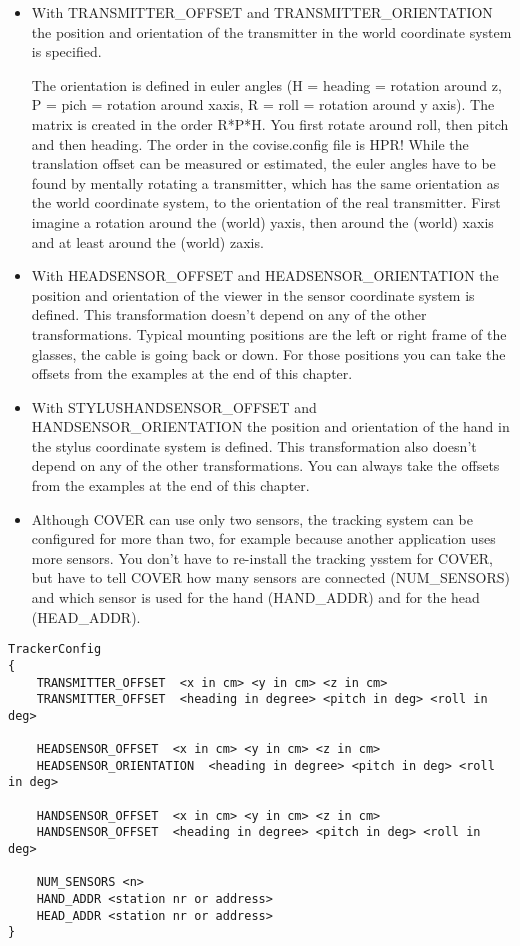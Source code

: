 \begin{itemize}

\item With TRANSMITTER\_OFFSET and 
TRANSMITTER\_ORIENTATION the position and orientation of
the transmitter in the world coordinate system is specified.

The orientation is defined in euler angles (H  = heading = rotation around z, 
P = pich = rotation around xaxis, R = roll = rotation around y axis).
The matrix is created in the order R*P*H. You first rotate around roll, then
pitch and then heading. The order in the covise.config file is HPR!
While the translation offset can be measured or estimated, the euler angles
have to be found by mentally rotating a transmitter, which has the
same orientation as the world coordinate system, to the orientation
of the real transmitter. First imagine a rotation around the (world) yaxis, 
then around the (world) xaxis and at least around the (world) zaxis.


\item With HEADSENSOR\_OFFSET and HEADSENSOR\_ORIENTATION the position and 
orientation of the viewer in the sensor coordinate system 
is defined. This transformation doesn't depend on any of the other 
transformations. Typical mounting positions are the left or right frame
of the glasses, the cable is going back or down. For those positions 
you can take the offsets from the examples at the end of this chapter.

\item With STYLUSHANDSENSOR\_OFFSET and HANDSENSOR\_ORIENTATION the position and
orientation of the hand in the stylus coordinate system is
defined. This transformation also doesn't depend on any of the other 
transformations. You can always take the offsets from the examples at the
end of this chapter.

\item Although COVER can use only two sensors, the tracking system can be
configured for more than two, for example because another application
uses more sensors. You don't have to re-install the tracking ysstem for COVER,
but have to tell COVER how many sensors are connected (NUM\_SENSORS) 
and which sensor is used for the hand (HAND\_ADDR) and for the head (HEAD\_ADDR).

\end{itemize}

\begin{verbatim}
TrackerConfig
{
    TRANSMITTER_OFFSET  <x in cm> <y in cm> <z in cm>
    TRANSMITTER_OFFSET  <heading in degree> <pitch in deg> <roll in deg> 
    
    HEADSENSOR_OFFSET  <x in cm> <y in cm> <z in cm>
    HEADSENSOR_ORIENTATION  <heading in degree> <pitch in deg> <roll in deg>
    
    HANDSENSOR_OFFSET  <x in cm> <y in cm> <z in cm>
    HANDSENSOR_OFFSET  <heading in degree> <pitch in deg> <roll in deg>

    NUM_SENSORS <n>
    HAND_ADDR <station nr or address>
    HEAD_ADDR <station nr or address>
}
\end{verbatim} 

